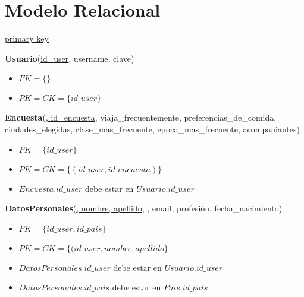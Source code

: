 \section{Modelo Relacional}

\begin{framed} \centering
  \underline{primary key} \hspace*{3cm}
\end{framed}

\vspace*{0.1cm}
\noindent
\textbf{Usuario}(\underline{id\_user}, username, clave)
\begin{itemize}[noitemsep]
	\item $FK = \{ \}$
	\item $PK = CK = \{id\_user\}$
\end{itemize}


\vspace*{0.1cm}
\noindent
\textbf{Encuesta}(\underline{, id\_encuesta},
	viaja\_frecuentemente, preferencias\_de\_comida, ciudades\_elegidas,
	clase\_mas\_frecuente, epoca\_mas\_frecuente, acompaniantes)
\begin{itemize}[noitemsep]
	\item $FK = \{id\_user\}$
	\item $PK = CK = \{(id\_user, id\_encuesta)\}$
	\item $Encuesta.id\_user$ debe estar en $Usuario.id\_user$
\end{itemize}

\vspace*{0.1cm}
\noindent
\textbf{DatosPersonales}(\underline{, nombre, apellido},
	, email, profesión, fecha\_nacimiento)
\begin{itemize}[noitemsep]
	\item $FK = \{id\_user, id\_pais\}$
	\item $PK = CK = \{(id\_user, nombre, apellido\}$
	\item $DatosPersonales.id\_user$ debe estar en $Usuario.id\_user$
	\item $DatosPersonales.id\_pais$ debe estar en $Pais.id\_pais$
\end{itemize}

